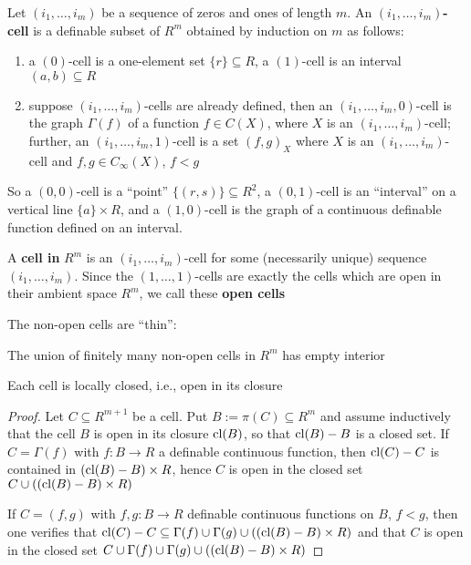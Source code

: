 \documentclass[11pt]{article}
\begin{document}
\begin{definition}[]
Let \((i_1,\dots,i_m)\) be a sequence of zeros and ones of length \(m\). An \textbf{\((i_1,\dots,i_m)\)-cell} is a
definable subset of \(R^m\) obtained by induction on \(m\) as follows:
\begin{enumerate}
\item a \((0)\)-cell is a one-element set \(\{r\}\subseteq R\), a \((1)\)-cell is an
interval \((a,b)\subseteq R\)
\item suppose \((i_1,\dots,i_m)\)-cells are already defined, then an \((i_1,\dots,i_m,0)\)-cell is the
graph \(\Gamma(f)\) of a function \(f\in C(X)\), where \(X\) is an \((i_1,\dots,i_m)\)-cell; further,
an \((i_1,\dots,i_m,1)\)-cell is a set \((f,g)_X\) where \(X\) is an \((i_1,\dots,i_m)\)-cell
and \(f,g\in C_\infty(X)\), \(f<g\)
\end{enumerate}
\end{definition}

So a \((0,0)\)-cell is a ``point'' \(\{(r,s)\}\subseteq R^2\), a \((0,1)\)-cell is an ``interval'' on a
vertical line \(\{a\}\times R\), and a \((1,0)\)-cell is the graph of a continuous definable function
defined on an interval.

\begin{definition}[]
A \textbf{cell in} \(R^m\) is an \((i_1,\dots,i_m)\)-cell for some (necessarily unique)
sequence \((i_1,\dots,i_m)\). Since the \((1,\dots,1)\)-cells are exactly the cells which are open in
their ambient space \(R^m\), we call these \textbf{open cells}
\end{definition}

The non-open cells are ``thin'':

The union of finitely many non-open cells in \(R^m\) has empty interior

\begin{proposition}[]
Each cell is locally closed, i.e., open in its closure
\end{proposition}

\begin{proof}
Let \(C\subseteq R^{m+1}\) be a cell. Put \(B:=\pi(C)\subseteq R^m\) and assume inductively that the cell \(B\) is
open in its closure \(\operatorname{\text{cl}}(B)\), so that \(\operatorname{\text{cl}}(B)-B\) is a closed set. If \(C=\Gamma(f)\)
with \(f:B\to R\) a definable continuous function, then \(\operatorname{\text{cl}}(C)-C\) is contained
in \((\operatorname{\text{cl}}(B)-B)\times R\), hence \(C\) is open in the closed set \(C\cup((\operatorname{\text{cl}}(B)- B)\times R)\)  \label{Problem1}

If \(C=(f,g)\) with \(f,g:B\to R\) definable continuous functions on \(B\), \(f<g\), then one
verifies that \(\operatorname{\text{cl}}(C)-C\subseteq\Gamma(f)\cup\Gamma(g)\cup((\operatorname{\text{cl}}(B)-B)\times R)\) and that \(C\) is open in the closed set
\(C\cup\Gamma(f)\cup\Gamma(g)\cup((\operatorname{\text{cl}}(B)-B)\times R)\)
\end{proof}
\end{document}
